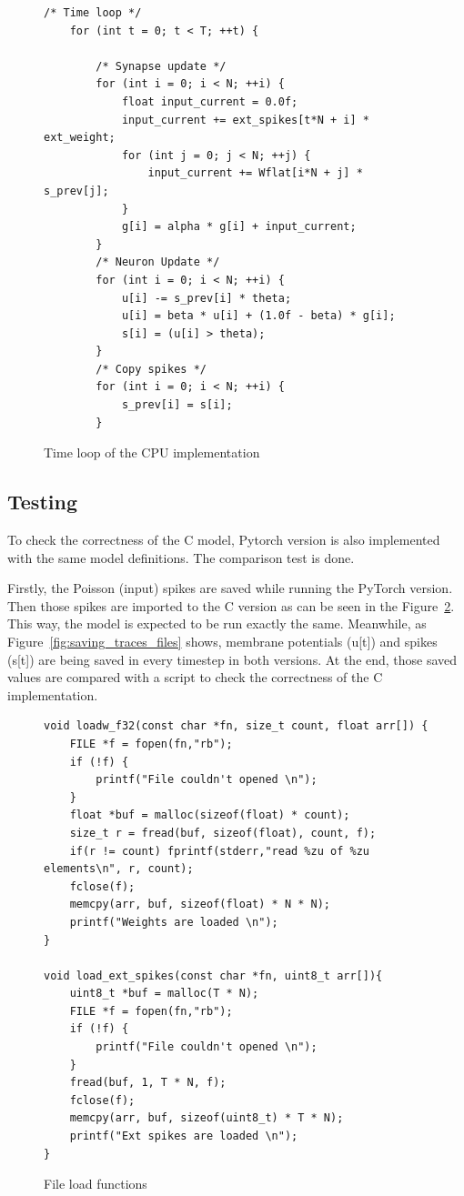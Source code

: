 \documentclass[conference]{IEEEtran}
\begin{document}
  \begin{figure}[h]
\centering
\begin{lstlisting}
/* Time loop */
    for (int t = 0; t < T; ++t) {

        /* Synapse update */
        for (int i = 0; i < N; ++i) {
            float input_current = 0.0f;
            input_current += ext_spikes[t*N + i] * ext_weight;
            for (int j = 0; j < N; ++j) {
                input_current += Wflat[i*N + j] * s_prev[j];
            }
            g[i] = alpha * g[i] + input_current;
        }
        /* Neuron Update */
        for (int i = 0; i < N; ++i) {
            u[i] -= s_prev[i] * theta;
            u[i] = beta * u[i] + (1.0f - beta) * g[i];
            s[i] = (u[i] > theta);
        }
        /* Copy spikes */
        for (int i = 0; i < N; ++i) {
            s_prev[i] = s[i];
        }
\end{lstlisting}
\caption{Time loop of the CPU implementation}
\label{fig:C_impl}
\end{figure}

\subsection{Testing}
To check the correctness of the C model, 
Pytorch version is also implemented with the same model definitions. 
The comparison test is done.

  Firstly, the Poisson (input) spikes are saved while running the PyTorch version. 
  Then those spikes are imported to the C version as can be seen in the Figure~\ref{fig:file_load_func}.
  This way, the model is expected to be run exactly the same. 
  Meanwhile, as Figure~\ref{fig:saving_traces_files} shows, membrane potentials (u[t]) and spikes (s[t]) are being saved in every timestep in both versions. 
  At the end, those saved values are compared with a script to check the correctness of the C implementation.
  \begin{figure}[h]
\centering
\begin{lstlisting}
void loadw_f32(const char *fn, size_t count, float arr[]) {
    FILE *f = fopen(fn,"rb");
    if (!f) {
        printf("File couldn't opened \n");
    }
    float *buf = malloc(sizeof(float) * count);
    size_t r = fread(buf, sizeof(float), count, f);
    if(r != count) fprintf(stderr,"read %zu of %zu elements\n", r, count);
    fclose(f);
    memcpy(arr, buf, sizeof(float) * N * N);
    printf("Weights are loaded \n");
}

void load_ext_spikes(const char *fn, uint8_t arr[]){
    uint8_t *buf = malloc(T * N);
    FILE *f = fopen(fn,"rb");
    if (!f) {
        printf("File couldn't opened \n");
    }
    fread(buf, 1, T * N, f);
    fclose(f);
    memcpy(arr, buf, sizeof(uint8_t) * T * N);
    printf("Ext spikes are loaded \n");
}
\end{lstlisting}
\caption{File load functions}
\label{fig:file_load_func}
\end{figure}
\end{document}
